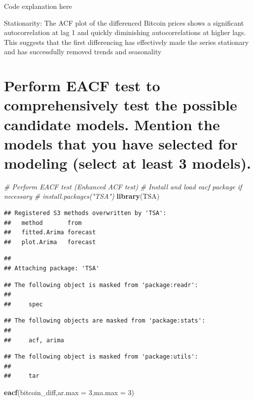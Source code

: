 \documentclass[
]{book}
\newenvironment{Shaded}{\begin{snugshade}}{\end{snugshade}}
\newcommand{\AttributeTok}[1]{\textcolor[rgb]{0.13,0.29,0.53}{#1}}
\newcommand{\CommentTok}[1]{\textcolor[rgb]{0.56,0.35,0.01}{\textit{#1}}}
\newcommand{\DecValTok}[1]{\textcolor[rgb]{0.00,0.00,0.81}{#1}}
\newcommand{\FunctionTok}[1]{\textcolor[rgb]{0.13,0.29,0.53}{\textbf{#1}}}
\newcommand{\NormalTok}[1]{#1}
\begin{document}
Code explanation here

Stationarity:
The ACF plot of the differenced Bitcoin prices shows a significant autocorrelation at lag 1 and quickly diminishing autocorrelations at higher lags. This suggests that the first differencing has effectively made the series stationary and has successfully removed trends and seasonality

\section{Perform EACF test to comprehensively test the possible candidate models. Mention the models that you have selected for modeling (select at least 3 models).}\label{perform-eacf-test-to-comprehensively-test-the-possible-candidate-models.-mention-the-models-that-you-have-selected-for-modeling-select-at-least-3-models.}

\begin{Shaded}
\begin{Highlighting}[]
\CommentTok{\# Perform EACF test (Enhanced ACF test)}
\CommentTok{\# Install and load eacf package if necessary}
\CommentTok{\# install.packages("TSA")}
\FunctionTok{library}\NormalTok{(TSA)}
\end{Highlighting}
\end{Shaded}

\begin{verbatim}
## Registered S3 methods overwritten by 'TSA':
##   method       from    
##   fitted.Arima forecast
##   plot.Arima   forecast
\end{verbatim}

\begin{verbatim}
## 
## Attaching package: 'TSA'
\end{verbatim}

\begin{verbatim}
## The following object is masked from 'package:readr':
## 
##     spec
\end{verbatim}

\begin{verbatim}
## The following objects are masked from 'package:stats':
## 
##     acf, arima
\end{verbatim}

\begin{verbatim}
## The following object is masked from 'package:utils':
## 
##     tar
\end{verbatim}

\begin{Shaded}
\begin{Highlighting}[]
\FunctionTok{eacf}\NormalTok{(bitcoin\_diff,}\AttributeTok{ar.max =} \DecValTok{3}\NormalTok{,}\AttributeTok{ma.max =} \DecValTok{3}\NormalTok{)}
\end{Highlighting}
\end{Shaded}
\end{document}

